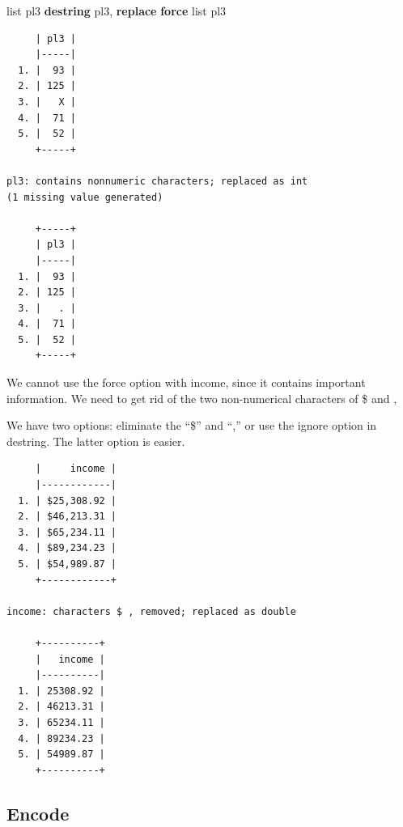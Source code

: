 \documentclass[
]{book}
\newenvironment{Shaded}{\begin{snugshade}}{\end{snugshade}}
\newcommand{\KeywordTok}[1]{\textcolor[rgb]{0.13,0.29,0.53}{\textbf{#1}}}
\newcommand{\NormalTok}[1]{#1}
\newcommand{\OtherTok}[1]{\textcolor[rgb]{0.56,0.35,0.01}{#1}}
\newcommand{\StringTok}[1]{\textcolor[rgb]{0.31,0.60,0.02}{#1}}
\begin{document}
\begin{Shaded}
\begin{Highlighting}[]
\OtherTok{list}\NormalTok{ pl3}
\KeywordTok{destring}\NormalTok{ pl3, }\KeywordTok{replace} \KeywordTok{force}
\OtherTok{list}\NormalTok{ pl3}
\end{Highlighting}
\end{Shaded}

\begin{verbatim}
     | pl3 |
     |-----|
  1. |  93 |
  2. | 125 |
  3. |   X |
  4. |  71 |
  5. |  52 |
     +-----+

pl3: contains nonnumeric characters; replaced as int
(1 missing value generated)

     +-----+
     | pl3 |
     |-----|
  1. |  93 |
  2. | 125 |
  3. |   . |
  4. |  71 |
  5. |  52 |
     +-----+
\end{verbatim}

We cannot use the force option with income, since it contains important information. We need to get rid of the two non-numerical characters of \$ and ,

We have two options: eliminate the ``\$'' and ``,'' or use the ignore option in destring. The latter option is easier.

\begin{Shaded}
\end{Shaded}

\begin{verbatim}
     |     income |
     |------------|
  1. | $25,308.92 |
  2. | $46,213.31 |
  3. | $65,234.11 |
  4. | $89,234.23 |
  5. | $54,989.87 |
     +------------+

income: characters $ , removed; replaced as double

     +----------+
     |   income |
     |----------|
  1. | 25308.92 |
  2. | 46213.31 |
  3. | 65234.11 |
  4. | 89234.23 |
  5. | 54989.87 |
     +----------+
\end{verbatim}

\subsection{Encode}\label{encode}
\end{document}
